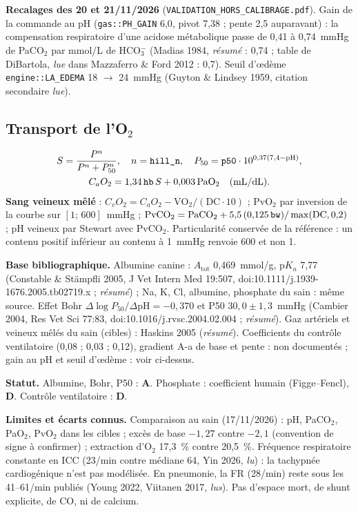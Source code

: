 \documentclass[10pt,a4paper]{article}
\newcommand{\cmd}[1]{\texttt{#1}}
\newcommand{\vp}[1]{\text{\texttt{\detokenize{#1}}}}
\newcommand{\evA}{\textcolor{green!45!black}{\textbf{A}}}
\newcommand{\evD}{\textcolor{red!70!black}{\textbf{D}}}
\newcommand{\acc}[1]{\textsl{#1}}
\newcommand{\limite}[1]{\par\textbf{Limites et écarts connus.} #1}
\newcommand{\sources}[1]{\par\textbf{Base bibliographique.} #1}
\begin{document}
\textbf{Recalages des 20 et 21/11/2026} (\cmd{VALIDATION\_HORS\_CALIBRAGE.pdf}). Gain de la commande au pH (\cmd{gas::PH\_GAIN} 6,0, pivot 7,38 ; pente 2,5 auparavant) : la compensation respiratoire d'une acidose métabolique passe de 0,41 à 0,74~mmHg de PaCO$_2$ par mmol/L de HCO$_3^-$ (Madias 1984, \acc{résumé} : 0,74 ; table de DiBartola, \acc{lue} dans Mazzaferro \& Ford 2012 : 0,7). Seuil d'œdème \cmd{engine::LA\_EDEMA} 18 $\to$ 24~mmHg (Guyton \& Lindsey 1959, citation secondaire \acc{lue}).

\subsection{Transport de l'O$_2$}
\begin{gather}
S = \frac{P^n}{P^n + P_{50}^n},\quad n = \vp{hill_n},\quad P_{50} = \vp{p50}\cdot 10^{0{,}37(7{,}4 - \text{pH})},\\
C_aO_2 = 1{,}34\,\vp{hb}\,S + 0{,}003\,\text{PaO}_2\quad(\text{mL/dL}).
\end{gather}
\textbf{Sang veineux mêlé} : $C_vO_2 = C_aO_2 - \text{VO}_2/(\text{DC}\cdot 10)$ ; PvO$_2$ par inversion de la courbe sur $[1;\,600]$~mmHg ; $\text{PvCO}_2 = \text{PaCO}_2 + 5{,}5\,(0{,}125\,\vp{bw})/\max(\text{DC}, 0{,}2)$ ; pH veineux par Stewart avec PvCO$_2$. Particularité conservée de la référence : un contenu positif inférieur au contenu à 1~mmHg renvoie 600 et non 1.

\sources{Albumine canine : $A_\text{tot}$ 0,469~mmol/g, p$K_a$ 7,77 (Constable \& Stämpfli 2005, J Vet Intern Med 19:507, doi:10.1111/j.1939-1676.2005.tb02719.x ; \acc{résumé}) ; Na, K, Cl, albumine, phosphate du sain : même source. Effet Bohr $\Delta\log P_{50}/\Delta\text{pH} = -0{,}370$ et P50 $30{,}0 \pm 1{,}3$~mmHg (Cambier 2004, Res Vet Sci 77:83, doi:10.1016/j.rvsc.2004.02.004 ; \acc{résumé}). Gaz artériels et veineux mêlés du sain (cibles) : Haskins 2005 (\acc{résumé}). Coefficients du contrôle ventilatoire (0,08 ; 0,03 ; 0,12), gradient A-a de base et pente \vp{edema_k} : non documentés ; gain au pH et seuil d'œdème : voir ci-dessus.}

\textbf{Statut.} Albumine, Bohr, P50 : \evA{}. Phosphate : coefficient humain (Figge--Fencl), \evD{}. Contrôle ventilatoire : \evD{}.

\limite{Comparaison au sain (17/11/2026) : pH, PaCO$_2$, PaO$_2$, PvO$_2$ dans les cibles ; excès de base $-1{,}27$ contre $-2{,}1$ (convention de signe à confirmer) ; extraction d'O$_2$ 17,3~\% contre 20,5~\%. Fréquence respiratoire constante en ICC (23/min contre médiane 64, Yin 2026, \acc{lu}) : la tachypnée cardiogénique n'est pas modélisée. En pneumonie, la FR (28/min) reste sous les 41--61/min publiés (Young 2022, Viitanen 2017, \acc{lus}). Pas d'espace mort, de shunt explicite, de CO, ni de calcium.}
\end{document}
